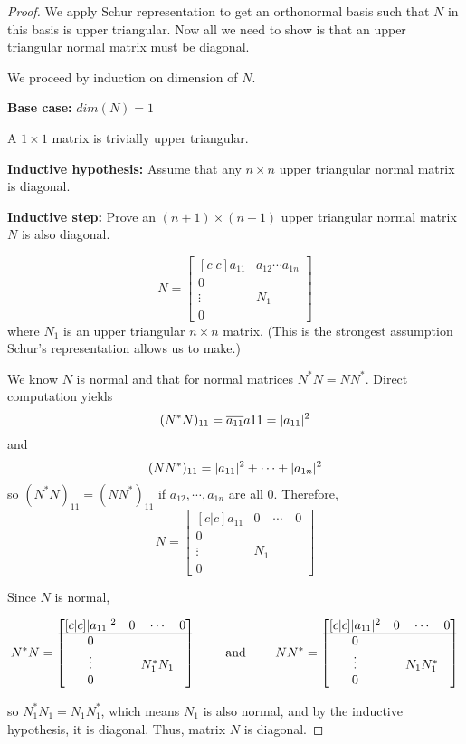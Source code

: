 \begin{proof}
We apply Schur representation to get an orthonormal basis such that $N$ in this basis is upper triangular. Now all we need to show is that an upper triangular normal matrix must be diagonal. 

We proceed by induction on dimension of $N$. 

\textbf{Base case: } $dim(N) = 1$

A $1 \times 1$ matrix is trivially upper triangular. 

\textbf{Inductive hypothesis: } Assume that any $n \times n$ upper triangular normal matrix is diagonal. 

\textbf{Inductive step: } Prove an $(n+1) \times (n+1)$ upper triangular normal matrix $N$ is also diagonal. 

$$N = \begin{bmatrix}[c|c]
a_{11} & a_{12} \cdots a_{1n} \\
\hline
0 & \\
\vdots & N_{1} \\
0 & 
\end{bmatrix}$$
where $N_{1}$ is an upper triangular $n \times n$ matrix. (This is the strongest assumption Schur's representation allows us to make.)

We know $N$ is normal and that for normal matrices $N^{*}N = NN^{*}$. Direct computation yields 
$$(N^{*} N)_{11} = \overline{a_{11}} a{11} = \lvert a_{11}\rvert^{2}$$
and 
$$(NN^{*})_{11} = \lvert a_{11}\rvert^{2} + \cdots + \lvert a_{1n}\rvert^{2}$$
so $(N^{*}N)_{11} = (NN^{*})_{11}$ if $a_{12}, \cdots, a_{1n}$ are all 0. Therefore, 
$$N = \begin{bmatrix}[c|c]
a_{11} & 0 \quad \cdots \quad 0 \\
\hline
0 & \\
\vdots & N_{1} \\
0 & 
\end{bmatrix}$$

Since $N$ is normal, 

$$N^{*}N = \begin{bmatrix}[c|c]
\lvert a_{11}\rvert^{2} & 0 \quad \cdots \quad 0 \\
\hline
0 & \\
\vdots & N_{1}^{*} N_{1} \\
0 & 
\end{bmatrix} \qquad \text{ and } \qquad NN^{*} = \begin{bmatrix}[c|c]
\lvert a_{11}\rvert^{2} & 0 \quad \cdots \quad 0 \\
\hline
0 & \\
\vdots & N_{1} N_{1}^{*} \\
0 & 
\end{bmatrix}$$

so $N_{1}^{*} N_{1} = N_{1} N_{1}^{*}$, which means $N_{1}$ is also normal, and by the inductive hypothesis, it is diagonal. Thus, matrix $N$ is diagonal. 
\end{proof}

